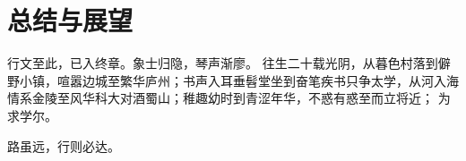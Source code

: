\chapter{总结与展望}
行文至此，已入终章。象士归隐，琴声渐廖。
往生二十载光阴，从暮色村落到僻野小镇，喧嚣边城至繁华庐州；书声入耳垂髫堂坐到奋笔疾书只争太学，从河入海情系金陵至风华科大对酒蜀山；稚趣幼时到青涩年华，不惑有惑至而立将近；
为求学尔。


路虽远，行则必达。